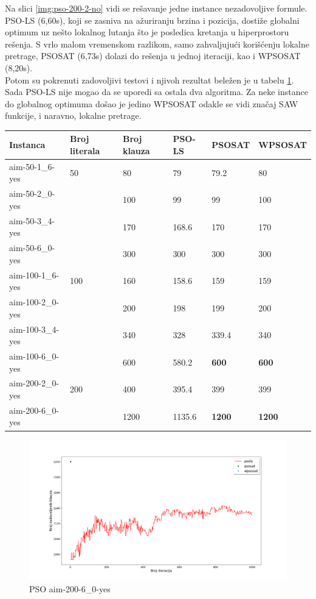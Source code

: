 \documentclass[a4paper]{article}
\begin{document}
Na slici \ref{img:pso-200-2-no} vidi se rešavanje jedne instance nezadovoljive formule.
PSO-LS (6,60s), koji se zasniva na ažuriranju brzina i pozicija, dostiže globalni optimum
uz nešto lokalnog lutanja što je posledica kretanja u hiperprostoru rešenja.
S vrlo malom vremenskom razlikom, samo zahvaljujući korišćenju lokalne pretrage, 
PSOSAT (6,73s) dolazi do rešenja u jednoj iteraciji, kao i WPSOSAT (8,20s). \\

Potom su pokrenuti zadovoljivi testovi i njivoh rezultat beležen je u tabelu
\ref{tab:SAT}. Sada PSO-LS nije mogao da se uporedi sa ostala dva algoritma. 
Za neke instance do globalnog optimuma došao je jedino WPSOSAT odakle se vidi značaj 
SAW funkcije, i naravno, lokalne pretrage.

\begin{table}[h!]
\centering
{}\label{tab:SAT} 
\begin{tabular}{ |p{2.5cm}|p{1.4cm}|p{1.4cm}||p{1.6cm}|p{1.6cm}|p{1.6cm}|}
\hline
 Instanca & Broj \break literala & Broj \break klauza & PSO-LS & PSOSAT & WPSOSAT \\
 \hline
 aim-50-1\_6-yes & 50 & 80 & 79 & 79.2 & 80 \\
 aim-50-2\_0-yes &  & 100 & 99 & 99 & 100 \\
 aim-50-3\_4-yes &  & 170 & 168.6 & 170 & 170 \\
 aim-50-6\_0-yes &  & 300 & 300 & 300 & 300 \\
 \hline
 aim-100-1\_6-yes & 100 & 160 & 158.6 & 159 & 159 \\
 aim-100-2\_0-yes &  & 200 & 198 & 199 & 200 \\
 aim-100-3\_4-yes &  & 340 & 328 & 339.4 & 340 \\ 
 aim-100-6\_0-yes &  & 600 & 580.2 & \textbf{600} & \textbf{600} \\
 \hline
 aim-200-2\_0-yes & 200 & 400 & 395.4 & 399 & 399 \\
 aim-200-6\_0-yes &  & 1200 & 1135.6 & \textbf{1200} & \textbf{1200} \\ 
 \hline
\end{tabular}
\end{table}

\begin{figure}[h!]
\centering
\includegraphics[width=\textwidth]{pso-aim-200-6_0-yes.png}
\caption{PSO aim-200-6\_0-yes}\label{img:pso-200-6-0-yes}
\end{figure}
\end{document}
